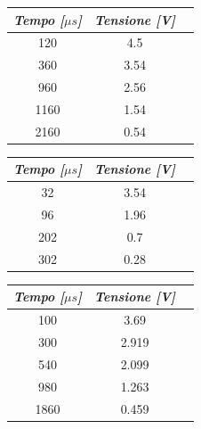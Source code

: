     \begin{table} [!htb]
        \begin{minipage}{.32\linewidth}
            \begin{tabular}{|c|c|c|}
                \hline
                \textit{Tempo [$\mu s$]} & \textit{Tensione [V]} \\
                \hline
                120 & 4.5 \\
                \hline
                360 & 3.54 \\
                \hline
                960 & 2.56 \\
                \hline
                1160 & 1.54 \\
                \hline
                2160 & 0.54 \\
                \hline
            \end{tabular}
        \end{minipage}
        \begin{minipage}{.32\linewidth}
            \begin{tabular}{|c|c|c|}
                \hline
                \textit{Tempo [$\mu s$]} & \textit{Tensione [V]} \\
                \hline
                32 & 3.54 \\
                \hline
                96 & 1.96 \\
                \hline
                202 & 0.7 \\
                \hline
                302 & 0.28 \\
                \hline
            \end{tabular}
        \end{minipage}
        \begin{minipage}{.32\linewidth}
            \begin{tabular}{|c|c|c|}
                \hline
                \textit{Tempo [$\mu s$]} & \textit{Tensione [V]} \\
                \hline
                100 & 3.69 \\
                \hline
                300 & 2.919 \\
                \hline
                540 & 2.099 \\
                \hline
                980 & 1.263 \\
                \hline
                1860 & 0.459 \\
                \hline
            \end{tabular}
        \end{minipage}
        
    \end{table}

